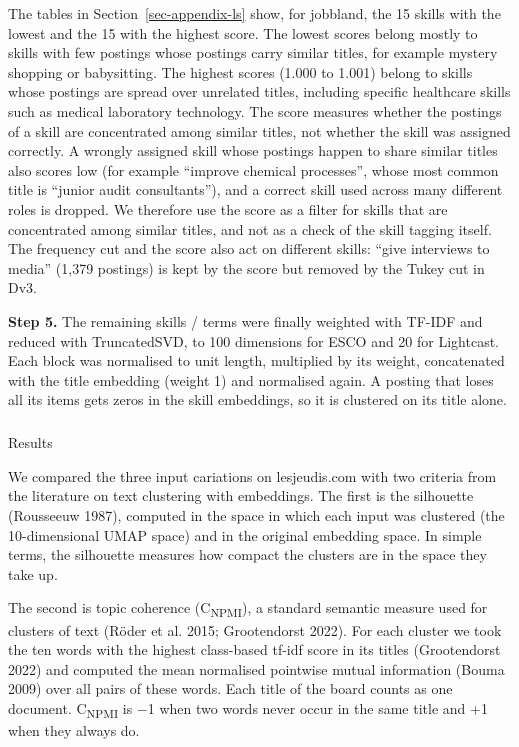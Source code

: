 \documentclass[
  letterpaper,
  DIV=11,
  numbers=noendperiod,
  sfdefaults=false]{scrartcl}
\makeatletter
\let\oldsubparagraph\subparagraph
\renewcommand{\subparagraph}{
    \@ifstar
      \xxxSubParagraphStar
      \xxxSubParagraphNoStar
  }
\newcommand{\xxxSubParagraphStar}[1]{\oldsubparagraph*{#1}\mbox{}}
\newcommand{\xxxSubParagraphNoStar}[1]{\oldsubparagraph{#1}\mbox{}}
\makeatother
\begin{document}
The tables in Section~\ref{sec-appendix-ls} show, for jobbland, the 15
skills with the lowest and the 15 with the highest score. The lowest
scores belong mostly to skills with few postings whose postings carry
similar titles, for example mystery shopping or babysitting. The highest
scores (1.000 to 1.001) belong to skills whose postings are spread over
unrelated titles, including specific healthcare skills such as medical
laboratory technology. The score measures whether the postings of a
skill are concentrated among similar titles, not whether the skill was
assigned correctly. A wrongly assigned skill whose postings happen to
share similar titles also scores low (for example ``improve chemical
processes'', whose most common title is ``junior audit consultants''),
and a correct skill used across many different roles is dropped. We
therefore use the score as a filter for skills that are concentrated
among similar titles, and not as a check of the skill tagging itself.
The frequency cut and the score also act on different skills: ``give
interviews to media'' (1,379 postings) is kept by the score but removed
by the Tukey cut in Dv3.

\textbf{Step 5.} The remaining skills / terms were finally weighted with
TF-IDF and reduced with TruncatedSVD, to 100 dimensions for ESCO and 20
for Lightcast. Each block was normalised to unit length, multiplied by
its weight, concatenated with the title embedding (weight 1) and
normalised again. A posting that loses all its items gets zeros in the
skill embeddings, so it is clustered on its title alone.

\subparagraph{Results}\label{results}

We compared the three input cariations on lesjeudis.com with two
criteria from the literature on text clustering with embeddings. The
first is the silhouette (Rousseeuw 1987), computed in the space in which
each input was clustered (the 10-dimensional UMAP space) and in the
original embedding space. In simple terms, the silhouette measures how
compact the clusters are in the space they take up.

The second is topic coherence (C\textsubscript{NPMI}), a standard
semantic measure used for clusters of text (Röder et al. 2015;
Grootendorst 2022). For each cluster we took the ten words with the
highest class-based tf-idf score in its titles (Grootendorst 2022) and
computed the mean normalised pointwise mutual information (Bouma 2009)
over all pairs of these words. Each title of the board counts as one
document. C\textsubscript{NPMI} is −1 when two words never occur in the
same title and +1 when they always do.
\end{document}
